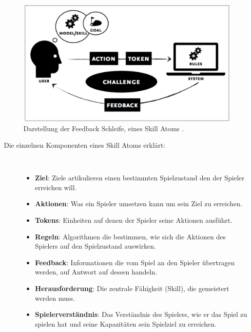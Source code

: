 \documentclass[a4paper,12pt,twoside]{scrartcl}
\begin{document}
\begin{figure}[h!]
\begin{center}
\includegraphics[scale = 0.6]{Bilder/SkillAtoms.eps}
\caption{Darstellung der Feedback Schleife, eines Skill Atoms \cite{Deterding2013}.}
\label{SkillAtomBild}
\end{center}
\end{figure}
\begin{description}
   \item[Die einzelnen Komponenten eines Skill Atoms erklärt:]~\par
   \begin{itemize}
      \item \textbf{Ziel}: Ziele artikulieren einen bestimmten Spielzustand den der Spieler erreichen will. 
      \item \textbf{Aktionen}: Was ein Spieler umsetzen kann um sein Ziel zu erreichen.
      \item \textbf{Tokens}: Einheiten auf denen der Spieler seine Aktionen ausführt.
      \item \textbf{Regeln}: Algorithmen die bestimmen, wie sich die Aktionen des Spielers auf den Spielzustand auswirken.
      \item \textbf{Feedback}: Informationen die vom Spiel an den Spieler übertragen werden, auf Antwort auf dessen handeln.	  
      \item \textbf{Herausforderung}: Die zentrale Fähigkeit (Skill), die gemeistert werden muss.
      \item \textbf{Spielerverständnis}: Das Verständnis des Spielers, wie er das Spiel zu spielen hat und seine Kapazitäten sein Spielziel zu erreichen.
   \end{itemize}
\end{description}
\end{document}
